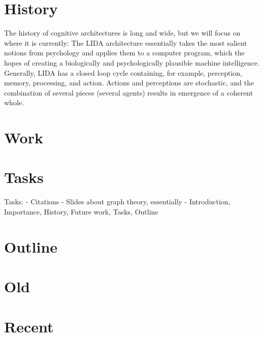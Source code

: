 \documentclass{nature}
\begin{document}
\section{History}


    The history of cognitive architectures is long and wide, but we will focus on where it is currently: 
    The LIDA architecture essentially takes the most salient notions from psychology and applies them to a computer program, which the hopes of creating a biologically and psychologically plausible machine intelligence.
    Generally, LIDA has a closed loop cycle containing, for example, perception, memory, processing, and action.
    Actions and perceptions are stochastic, and the combination of several pieces (several agents) results in emergence of a coherent whole.

\section{Work}


\section{Tasks}

Tasks:
 - Citations
 - Slides about graph theory, essentially
 - Introduction, Importance, History, Future work, Tasks, Outline

\section{Outline}

\section{Old}


\section{Recent}
\end{document}

